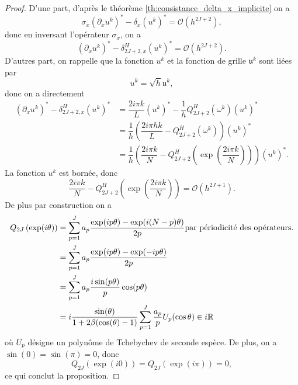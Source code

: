 \begin{proof}
D'une part, d'après le théorème \ref{th:consistance_delta_x_implicite} on a
\begin{equation}
\sigma_x (\partial_x u^k)^* - \delta_{x}(u^k)^* = \mathcal{O}(h^{2J+2}),
\end{equation}
donc en inversant l'opérateur $\sigma_x$, on a
\begin{equation}
(\partial_x u^k)^* - \delta_{2J+2,x}^H(u^k)^* = \mathcal{O}(h^{2J+2}).
\end{equation}
D'autres part, on rappelle que la fonction $u^k$ et la fonction de grille $\mathfrak{u}^k$ sont liées par
\begin{equation}
u^k = \sqrt{h} \mathfrak{u}^k,
\end{equation}
donc on a directement 
\begin{align*}
(\partial_x u^k)^* - \delta_{2J+2,x}^H (u^k)^* & = \dfrac{2 i \pi k}{L}(u^k)^* - \dfrac{1}{h}Q_{2J+2}^H(\omega^k) (u^k)^* \\
	& = \dfrac{1}{h} \left( \dfrac{2 i \pi h k}{L} - Q_{2J+2}^H(\omega^k) \right) (u^k)^*\\
	& = \dfrac{1}{h} \left( \dfrac{2 i \pi k}{N} - Q_{2J+2}^H \left( \exp \left( \dfrac{2 i \pi k}{N} \right) \right) \right) (u^k)^* .
\end{align*}
La fonction $u^k$ est bornée, donc
\begin{equation}
\dfrac{2 i \pi k}{N} - Q_{2J+2}^H \left( \exp \left( \dfrac{2 i \pi k}{N} \right) \right) = \mathcal{O}(h^{2J+1}).
\end{equation}
De plus par construction on a
\begin{align*}
Q_{2J} \left( \exp ( i \theta ) \right) & = \displaystyle\sum\limits_{p=1}^J a_p \dfrac{\exp ( i p \theta ) - \exp ( i (N-p) \theta )}{2 p} \text{par périodicité des opérateurs.} \\
	& = \displaystyle\sum\limits_{p=1}^J a_p \dfrac{\exp ( i p \theta ) - \exp ( -i p \theta )}{2 p} \\
	& = \displaystyle\sum\limits_{p=1}^J a_p \dfrac{i \sin (p \theta )}{p} \cos ( p \theta)\\
	& = i \dfrac{\sin(\theta)}{1 +2 \beta (\cos (\theta) -1)} \displaystyle\sum\limits_{p=1}^J \dfrac{a_p}{p} U_p (\cos \theta) \in i \mathbb{R}
\end{align*}
où $U_p$ désigne un polynôme de Tchebychev de seconde espèce.
De plus, on a $\sin (0 ) = \sin (\pi) = 0$, donc 
\begin{equation}
Q_{2J} \left( \exp ( i 0 ) \right) = Q_{2J} \left( \exp ( i \pi ) \right) = 0,
\end{equation}
ce qui conclut la proposition.
\end{proof}

